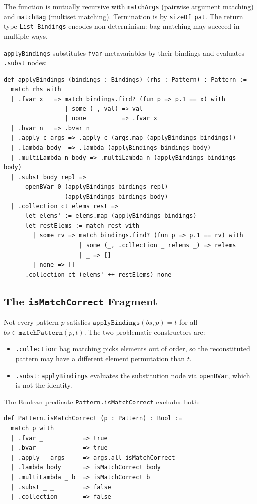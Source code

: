 \documentclass[]{article}
\newcommand{\code}[1]{\texttt{#1}}
\begin{document}
The function is mutually recursive with \code{matchArgs} (pairwise argument
matching) and \code{matchBag} (multiset matching).  Termination is by
\code{sizeOf pat}.  The return type \code{List Bindings} encodes non-determinism:
bag matching may succeed in multiple ways.

\code{applyBindings} substitutes \code{fvar} metavariables by their bindings and
evaluates \code{.subst} nodes:

\begin{lstlisting}[language=lean]
def applyBindings (bindings : Bindings) (rhs : Pattern) : Pattern :=
  match rhs with
  | .fvar x   => match bindings.find? (fun p => p.1 == x) with
                 | some (_, val) => val
                 | none          => .fvar x
  | .bvar n   => .bvar n
  | .apply c args => .apply c (args.map (applyBindings bindings))
  | .lambda body  => .lambda (applyBindings bindings body)
  | .multiLambda n body => .multiLambda n (applyBindings bindings body)
  | .subst body repl =>
      openBVar 0 (applyBindings bindings repl)
                 (applyBindings bindings body)
  | .collection ct elems rest =>
      let elems' := elems.map (applyBindings bindings)
      let restElems := match rest with
        | some rv => match bindings.find? (fun p => p.1 == rv) with
                     | some (_, .collection _ relems _) => relems
                     | _ => []
        | none => []
      .collection ct (elems' ++ restElems) none
\end{lstlisting}

\subsection{The \texttt{isMatchCorrect} Fragment}

Not every pattern $p$ satisfies $\code{applyBindings}(bs, p) = t$ for all
$bs \in \code{matchPattern}(p, t)$.  The two problematic constructors are:
\begin{itemize}
\item \code{.collection}: bag matching picks elements out of order, so the
  reconstituted pattern may have a different element permutation than $t$.
\item \code{.subst}: \code{applyBindings} evaluates the substitution node via
  \code{openBVar}, which is not the identity.
\end{itemize}

The Boolean predicate \code{Pattern.isMatchCorrect} excludes both:

\begin{lstlisting}[language=lean]
def Pattern.isMatchCorrect (p : Pattern) : Bool :=
  match p with
  | .fvar _           => true
  | .bvar _           => true
  | .apply _ args     => args.all isMatchCorrect
  | .lambda body      => isMatchCorrect body
  | .multiLambda _ b  => isMatchCorrect b
  | .subst _ _        => false
  | .collection _ _ _ => false
\end{lstlisting}
\end{document}
